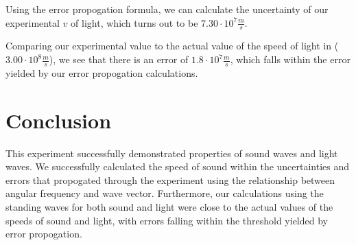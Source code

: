 \documentclass{article}
\begin{document}
Using the error propogation formula, we can calculate the uncertainty of our
experimental $v$ of light, which turns out to be $7.30 \cdot 10^{7}
\frac{m}{s}$.

Comparing our experimental value to the actual value of the speed of light in
($3.00\cdot10^{8}\frac{m}{s}$), we see that there is an error of
$1.8\cdot10^{7}\frac{m}{s}$, which falls within the error yielded by our error
propogation calculations.

\section{Conclusion}
This experiment successfully demonstrated properties of sound waves and light
waves. We successfully calculated the speed of sound within the uncertainties
and errors that propogated through the experiment using the relationship between
angular frequency and wave vector. Furthermore, our calculations using the
standing waves for both sound and light were close to the actual values of the
speeds of sound and light, with errors falling within the threshold yielded
by error propogation.
\end{document}
